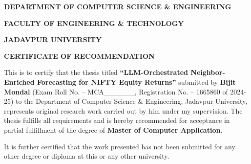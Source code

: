 \documentclass[12pt,a4paper,titlepage]{article}
\begin{document}
\begin{titlepage}
    \centering
    
    {\Large\bfseries DEPARTMENT OF COMPUTER SCIENCE \& ENGINEERING\par}
    \vspace{0.2cm}
    {\large\bfseries FACULTY OF ENGINEERING \& TECHNOLOGY\par}
    \vspace{0.2cm}
    {\large\bfseries JADAVPUR UNIVERSITY\par}
    
    \vspace{1.8cm}
    
    {\Large\bfseries CERTIFICATE OF RECOMMENDATION\par}
    
    \vspace{0.8cm}
    
    \begin{minipage}{0.9\textwidth}
        \setlength{\parindent}{1em}
        \setlength{\parskip}{0.6em}
        \normalsize
        
        This is to certify that the thesis titled \textbf{``LLM-Orchestrated Neighbor-Enriched Forecasting for NIFTY Equity Returns''} submitted by \textbf{Bijit Mondal} (Exam Roll No. -- MCA\_\_\_\_\_\_, Registration No. -- 1665860 of 2024-25) to the Department of Computer Science \& Engineering, Jadavpur University, represents original research work carried out by him under my supervision. The thesis fulfills all requirements and is hereby recommended for acceptance in partial fulfillment of the degree of \textbf{Master of Computer Application}.
        
        \vspace{0.3cm}
        
        It is further certified that the work presented has not been submitted for any other degree or diploma at this or any other university.
    \end{minipage}
    
    \vspace{1.2cm}
    

\end{titlepage}
\end{document}
